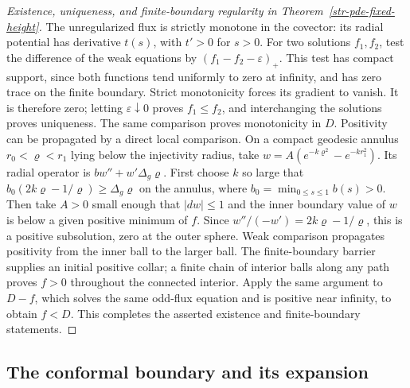 \begin{proof}[Existence, uniqueness, and finite-boundary regularity in
Theorem~\ref{str-pde-fixed-height}]
The unregularized flux is strictly monotone in the covector:
its radial potential has derivative $t(s)$, with $t'>0$ for
$s>0$. For two solutions $f_1,f_2$, test the difference of the
weak equations by $(f_1-f_2-\varepsilon)_+$. This test has compact
support, since both functions tend uniformly to zero at infinity,
and has zero trace on the finite boundary. Strict monotonicity
forces its gradient to vanish. It is therefore zero; letting
$\varepsilon\downarrow0$ proves $f_1\leq f_2$, and interchanging
the solutions proves uniqueness. The same comparison proves
monotonicity in $D$.
Positivity can be propagated by a direct local comparison.
On a compact geodesic annulus $r_0<\varrho<r_1$ lying below
the injectivity radius, take
$w=A(e^{-k\varrho^2}-e^{-kr_1^2})$. Its radial operator is
$b w''+w'\Delta_g\varrho$. First choose $k$ so large that
$b_0(2k\varrho-1/\varrho)\geq\Delta_g\varrho$ on the annulus,
where $b_0=\min_{0\leq s\leq1}b(s)>0$. Then take $A>0$
small enough that $|dw|\leq1$ and the inner boundary value
of $w$ is below a given positive minimum of $f$. Since
$w''/(-w')=2k\varrho-1/\varrho$, this is a positive
subsolution, zero at the outer sphere. Weak comparison
propagates positivity from the inner ball to the larger
ball. The finite-boundary barrier supplies an initial
positive collar; a finite chain of interior balls along
any path proves $f>0$ throughout the connected interior.
Apply the same argument to $D-f$, which solves the same
odd-flux equation and is positive near infinity, to obtain
$f<D$. This completes the asserted existence and
finite-boundary statements.
\end{proof}

\subsection{The conformal boundary and its expansion}

